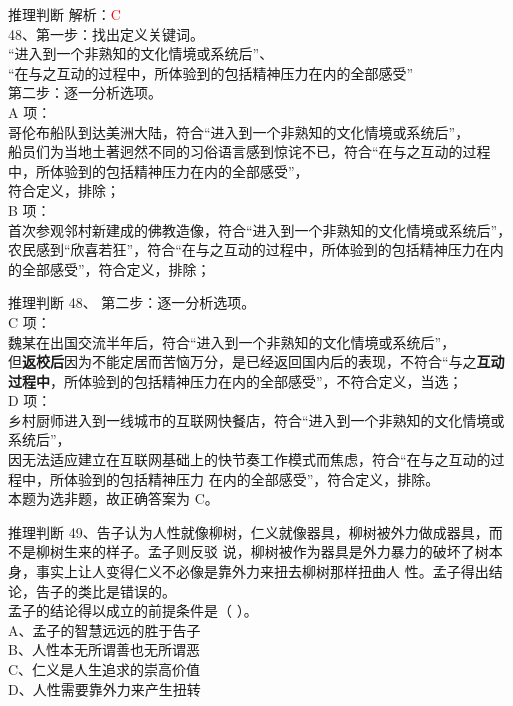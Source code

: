 \documentclass[aspectratio=169]{beamer}
\begin{document}
\begin{frame}[t]{推理判断}
    解析：\textcolor{red}{C}\\
    48、第一步：找出定义关键词。\\
    “进入到一个非熟知的文化情境或系统后”、\\
    “在与之互动的过程中，所体验到的包括精神压力在内的全部感受”\\
    第二步：逐一分析选项。\\
    A 项：\\
    哥伦布船队到达美洲大陆，符合“进入到一个非熟知的文化情境或系统后”，\\
    船员们为当地土著迥然不同的习俗语言感到惊诧不已，符合“在与之互动的过程中，所体验到的包括精神压力在内的全部感受”，\\
    符合定义，排除；\\
    B 项：\\
    首次参观邻村新建成的佛教造像，符合“进入到一个非熟知的文化情境或系统后”，\\
    农民感到“欣喜若狂”，符合“在与之互动的过程中，所体验到的包括精神压力在内的全部感受”，符合定义，排除；\\
\end{frame}

\begin{frame}[t]{推理判断}
    48、
    第二步：逐一分析选项。\\
    C 项：\\
    魏某在出国交流半年后，符合“进入到一个非熟知的文化情境或系统后”，\\
    但\textbf{返校后}因为不能定居而苦恼万分，是已经返回国内后的表现，不符合“与之\textbf{互动过程中}，所体验到的包括精神压力在内的全部感受”，不符合定义，当选；\\
    D 项：\\
    乡村厨师进入到一线城市的互联网快餐店，符合“进入到一个非熟知的文化情境或系统后”，\\
    因无法适应建立在互联网基础上的快节奏工作模式而焦虑，符合“在与之互动的过程中，所体验到的包括精神压力
    在内的全部感受”，符合定义，排除。\\

    本题为选非题，故正确答案为 C。\\
\end{frame}






\begin{frame}[t]{推理判断}
    49、告子认为人性就像柳树，仁义就像器具，柳树被外力做成器具，而不是柳树生来的样子。孟子则反驳
    说，柳树被作为器具是外力暴力的破坏了树本身，事实上让人变得仁义不必像是靠外力来扭去柳树那样扭曲人
    性。孟子得出结论，告子的类比是错误的。\\
    孟子的结论得以成立的前提条件是（ ）。 \\
    A、孟子的智慧远远的胜于告子           \\
    B、人性本无所谓善也无所谓恶           \\
    C、仁义是人生追求的崇高价值           \\
    D、人性需要靠外力来产生扭转           \\
\end{frame}                           
\end{document}

